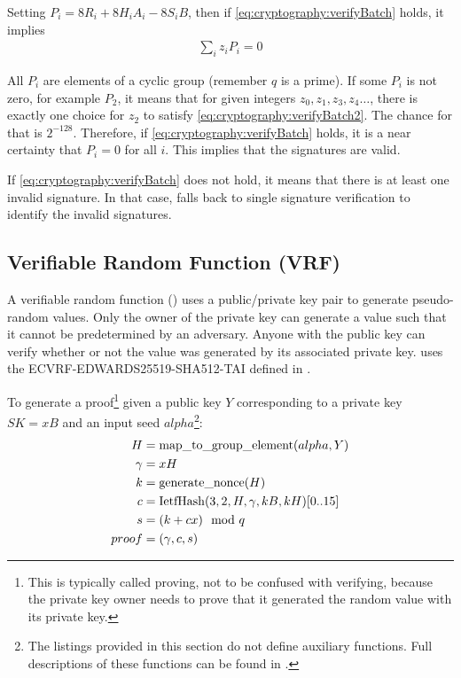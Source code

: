 Setting $P_i = 8 R_i + 8 H_i A_i - 8 S_i B$, then if \eqref{eq:cryptography:verifyBatch} holds, it implies
\begin{align}
	\sum_i{z_i P_i} = 0 \label{eq:cryptography:verifyBatch2}
\end{align}

All $P_i$ are elements of a cyclic group (remember $q$ is a prime).
If some $P_i$ is not zero, for example $P_2$, it means that for given integers $z_0, z_1, z_3, z_4 \ldots$, there is exactly one choice for $z_2$ to satisfy \eqref{eq:cryptography:verifyBatch2}.
The chance for that is $2^{-128}$.
Therefore, if \eqref{eq:cryptography:verifyBatch} holds, it is a near certainty that $P_i = 0$ for all $i$.
This implies that the signatures are valid.

If \eqref{eq:cryptography:verifyBatch} does not hold, it means that there is at least one invalid signature.
In that case, \codenamespace falls back to single signature verification to identify the invalid signatures.

\subsection{Verifiable Random Function (VRF)}
\label{sec:cryptography:vrf}

A verifiable random function () uses a public/private key pair to generate pseudo-random values.
Only the owner of the private key can generate a value such that it cannot be predetermined by an adversary.
Anyone with the public key can verify whether or not the value was generated by its associated private key.
\codenamespace uses the ECVRF-EDWARDS25519-SHA512-TAI defined in \cite{irtf-cfrg-vrf-07}.

To generate a proof\footnote{
	This is typically called proving, not to be confused with verifying, because the private key owner needs to prove that it generated
	the random value with its private key.
} given a public key $Y$ corresponding to a private key $SK = xB$ and an input seed $alpha$\footnote{
	The listings provided in this section do not define auxiliary functions.
	Full descriptions of these functions can be found in \cite{irtf-cfrg-vrf-07}.
}:
\begin{align*}
	H &= \mathrm{map\_to\_group\_element}(alpha, Y) \\
	\gamma &= xH \\
	k &= \mathrm{generate\_nonce}(H) \\
	c &= \mathrm{IetfHash}(3, 2, H, \gamma, kB, kH)[0..15] \\
	s &= (k + cx) \mod q \\
	proof &= (\gamma, c, s)
\end{align*}

